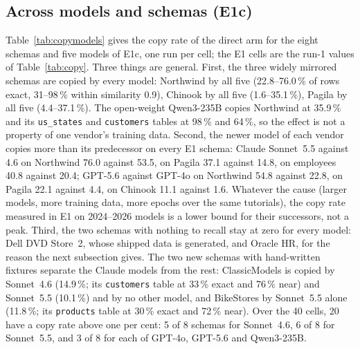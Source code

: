 \documentclass[preprint,12pt]{elsarticle}
\begin{document}
\subsection{Across models and schemas (E1c)}
\label{sec:models}
Table~\ref{tab:copymodels} gives the copy rate of the direct arm for the eight schemas and five models of E1c, one run per cell; the E1 cells are the run-1 values of Table~\ref{tab:copy}. Three things are general. First, the three widely mirrored schemas are copied by every model: Northwind by all five (22.8--76.0\,\% of rows exact, 31--98\,\% within similarity 0.9), Chinook by all five (1.6--35.1\,\%), Pagila by all five (4.4--37.1\,\%). The open-weight Qwen3-235B copies Northwind at 35.9\,\% and its \texttt{us\_states} and \texttt{customers} tables at 98\,\% and 64\,\%, so the effect is not a property of one vendor's training data. Second, the newer model of each vendor copies more than its predecessor on every E1 schema: Claude Sonnet~5.5 against 4.6 on Northwind 76.0 against 53.5, on Pagila 37.1 against 14.8, on employees 40.8 against 20.4; GPT-5.6 against GPT-4o on Northwind 54.8 against 22.8, on Pagila 22.1 against 4.4, on Chinook 11.1 against 1.6. Whatever the cause (larger models, more training data, more epochs over the same tutorials), the copy rate measured in E1 on 2024--2026 models is a lower bound for their successors, not a peak. Third, the two schemas with nothing to recall stay at zero for every model: Dell DVD Store~2, whose shipped data is generated, and Oracle HR, for the reason the next subsection gives. The two new schemas with hand-written fixtures separate the Claude models from the rest: ClassicModels is copied by Sonnet~4.6 (14.9\,\%; its \texttt{customers} table at 33\,\% exact and 76\,\% near) and Sonnet~5.5 (10.1\,\%) and by no other model, and BikeStores by Sonnet~5.5 alone (11.8\,\%; its \texttt{products} table at 30\,\% exact and 72\,\% near). Over the 40 cells, 20 have a copy rate above one per cent: 5 of 8 schemas for Sonnet~4.6, 6 of 8 for Sonnet~5.5, and 3 of 8 for each of GPT-4o, GPT-5.6 and Qwen3-235B.
\end{document}
